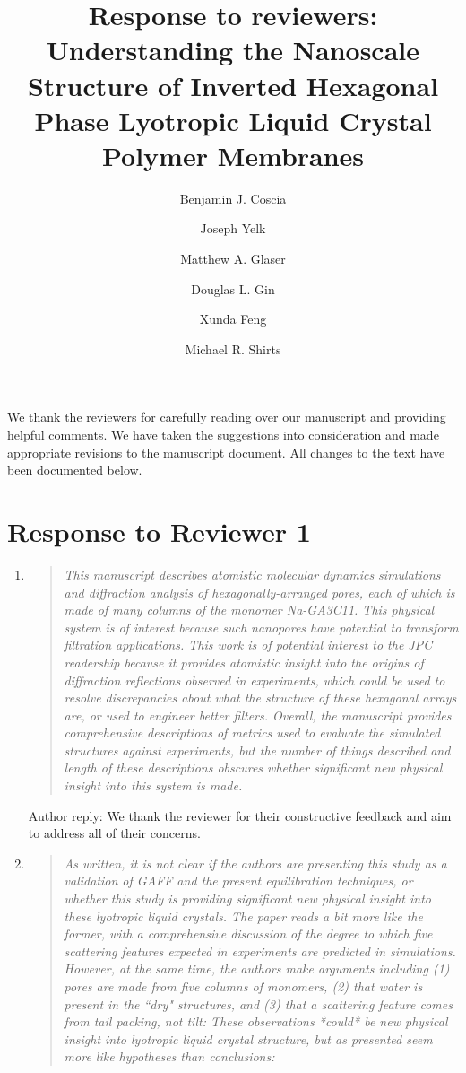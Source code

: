 \documentclass{article}
\title{Response to reviewers: Understanding the Nanoscale Structure of Inverted Hexagonal Phase Lyotropic Liquid Crystal Polymer Membranes}
\author{Benjamin J. Coscia \and Joseph Yelk \and Matthew A. Glaser \and Douglas L. Gin \and Xunda Feng \and Michael R. Shirts}
\begin{document}
 
\maketitle

We thank the reviewers for carefully reading over our manuscript and providing
helpful comments. We have taken the suggestions into consideration and made
appropriate revisions to the manuscript document. All changes to the text have
been documented below. 

\section{Response to Reviewer 1}

\begin{enumerate}
	
    \item \begin{quote} \textit{This manuscript describes atomistic molecular
	    dynamics simulations and diffraction analysis of hexagonally-arranged pores,
	    each of which is made of many columns of the monomer Na-GA3C11. This physical
	    system is of interest because such nanopores have potential to transform
	    filtration applications. This work is of potential interest to the JPC
	    readership because it provides atomistic insight into the origins of
	    diffraction reflections observed in experiments, which could be used to resolve
	    discrepancies about what the structure of these hexagonal arrays are, or used
	    to engineer better filters. Overall, the manuscript provides comprehensive
	    descriptions of metrics used to evaluate the simulated structures against
	    experiments, but the number of things described and length of these
	    descriptions obscures whether significant new physical insight into this system
	    is made.} 
    \end{quote}
	
    Author reply: We thank the reviewer for their constructive feedback and aim to 
    address all of their concerns. 
	
    \item \begin{quote}
    \textit{As written, it is not clear if the authors are presenting this
	    study as a validation of GAFF and the present equilibration techniques, or
	    whether this study is providing significant new physical insight into these
	    lyotropic liquid crystals. The paper reads a bit more like the former, with a
	    comprehensive discussion of the degree to which five scattering features
	    expected in experiments are predicted in simulations. However, at the same
	    time, the authors make arguments including (1) pores are made from five columns
	    of monomers, (2) that water is present in the ``dry" structures, and (3) that a
	    scattering feature comes from tail packing, not tilt: These observations
	    *could* be new physical insight into lyotropic liquid crystal structure, but as
	    presented seem more like hypotheses than conclusions:}


\end{quote}
\end{enumerate}
\end{document}
